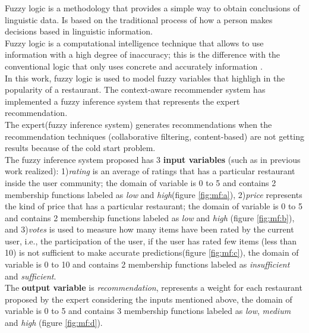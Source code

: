 Fuzzy logic is a methodology that provides a simple way to obtain
conclusions of linguistic data. Is based on the traditional process of
how a person makes decisions based in linguistic information. \\    Fuzzy
logic is a computational intelligence technique that allows to use
information with a high degree of inaccuracy; this is the difference
with the conventional logic that only uses concrete and accurately
information \cite{zedeh1989knowledge}.\\  In this work, fuzzy logic is
used to model fuzzy variables that highligh in the popularity of a
restaurant. The context-aware recommender system has implemented a
fuzzy inference system that represents the expert recommendation. \\   
The expert(fuzzy inference system) generates recommendations when the
recommendation techniques (collaborative filtering, content-based) are
not getting results because of the cold start problem.\\   The fuzzy
inference system proposed has 3 \textbf{input variables} (such as in
previous work realized\cite{garcia2009hybrid}): 1)\textit{rating} is
an average of ratings that has a particular restaurant inside the user
community; the domain of variable is 0 to 5 and contains 2 membership
functions labeled as \textit{low} and \textit{high}(figure
\ref{fig:mf:a}), 2)\textit{price} represents the kind of price that
has a particular restaurant; the domain of variable is 0 to 5 and
contains 2 membership functions labeled as \textit{low} and
\textit{high} (figure \ref{fig:mf:b}), and 3)\textit{votes} is used to
measure how many items have been rated by the current user, i.e., the
participation of the user, if the user has rated few items (less than
10) is not sufficient to make accurate predictions(figure
\ref{fig:mf:c}), the domain of variable is 0 to 10 and contains 2
membership functions labeled as \textit{insufficient} and
\textit{sufficient}. \\ The \textbf{output variable} is
\textit{recommendation}, represents a weight for each restaurant
proposed by the expert considering the inputs mentioned above, the
domain of variable is 0 to 5 and contains 3 membership functions
labeled as \textit{low}, \textit{medium} and \textit{high} (figure
\ref{fig:mf:d}).

